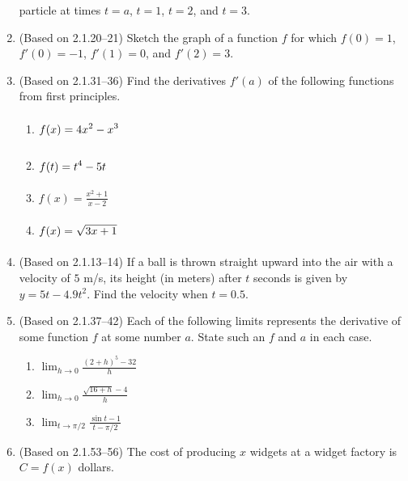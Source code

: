 \documentclass{article}
\newcommand{\ds}{\displaystyle}
\begin{document}
\begin{enumerate}
  particle at times $t=a$, $t=1$, $t=2$, and $t=3$.
\item (Based on 2.1.20--21) %
  Sketch the graph of a function $f$ for which $f(0)=1$, $f'(0)=-1$,
  $f'(1)=0$, and $f'(2)=3$.
\item (Based on 2.1.31--36) %
  Find the derivatives $f'(a)$ of the following functions from first
  principles.
  \begin{multicols}{4}
  \begin{enumerate}
  \item $\ds f(x)=4x^2-x^3 \vphantom{\frac{x^2}{x}}$
  \item $\ds f(t)=t^4-5t \vphantom{\frac{x^2}{x}}$ 
  \item $\ds f(x)=\frac{x^2+1}{x-2}$ 
  \item $\ds f(x)=\sqrt{3x+1} \vphantom{\frac{x^2}{x}}$ 
  \end{enumerate}
  \end{multicols}
\item (Based on 2.1.13--14) %
  If a ball is thrown straight upward into the air with a velocity of
  $5$ m/s, its height (in meters) after $t$ seconds is given by
  $y=5t-4.9t^2$.  Find the velocity when $t=0.5$.
\item (Based on 2.1.37--42) %
  Each of the following limits represents the derivative of some
  function $f$ at some number $a$.  State such an $f$ and $a$ in each
  case.
  \begin{multicols}{3}
  \begin{enumerate}
  \item $\ds \lim_{h\to 0} \frac{(2+h)^5-32}{h}$
  \item $\ds \lim_{h\to 0} \frac{\sqrt{16+h}-4}{h}$
  \item $\ds \lim_{t\to \pi/2} \frac{\sin t-1}{t-\pi/2}$
  \end{enumerate}
  \end{multicols}
\item (Based on 2.1.53--56) %
  The cost of producing $x$ widgets at a widget factory is $C=f(x)$
  dollars.
  \begin{enumerate}

\end{enumerate}
\end{enumerate}
\end{document}
